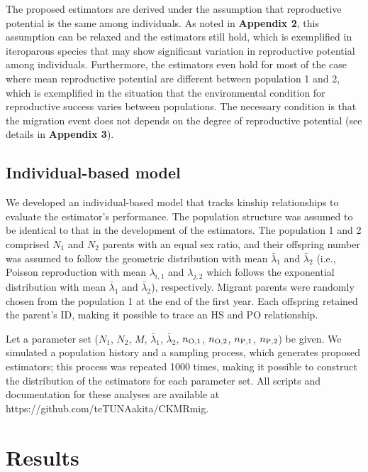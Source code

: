 \documentclass[12pt, English]{article}
\begin{document}
\begin{spacing}{1.9}
The proposed estimators are derived under the assumption that reproductive potential is the same among individuals. As noted in {\bf Appendix 2}, this assumption can be relaxed and the estimators still hold, which is exemplified in iteroparous species that may show significant variation in reproductive potential among individuals. Furthermore, the estimators even hold for most of the case where mean reproductive potential are different between population 1 and 2, which is exemplified in the situation that the environmental condition for reproductive success varies between populations. The necessary condition is that the migration event does not depends on the degree of reproductive potential (see details in  {\bf Appendix 3}). 

\subsection{Individual-based model}

We developed an individual-based model that tracks kinship relationships to evaluate the estimator's performance. The population structure was assumed to be identical to that in the development of the estimators. The population 1 and 2 comprised $N_1$ and $N_2$ parents with an equal sex ratio, and their offspring number was assumed to follow the geometric distribution with mean ${\bar \lambda_1}$ and ${\bar \lambda_2}$ (i.e., Poisson reproduction with mean $\lambda_{i,1}$ and $\lambda_{j,2}$ which follows the exponential distribution with mean ${\bar \lambda_1}$ and ${\bar \lambda_2}$), respectively. Migrant parents were randomly chosen from the population 1 at the end of the first year. Each offspring retained the parent's ID, making it possible to trace an HS and PO relationship.

Let a parameter set ($N_1$, $N_2$, $M$, ${\bar \lambda_1}$, ${\bar \lambda_2}$, $n_{\rm O,1}$, $n_{\rm O,2}$, $n_{\rm P,1}$, $n_{\rm P,2}$) be given. We simulated a population history and a sampling process, which generates proposed estimators; this process was repeated 1000 times, making it possible to construct the distribution of the estimators for each parameter set. All scripts and documentation for these analyses are available at \\https://github.com/teTUNAakita/CKMRmig.

\section{Results}\label{sec3}


\end{spacing}
\end{document}
